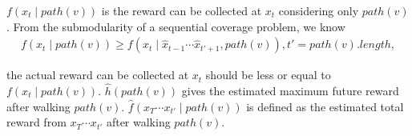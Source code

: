 \documentclass[12pt]{article}
\begin{document}
$ f(x_{t} \mid path(v)) $ is the reward can be collected at $ x_{t} $ considering only $ path(v) $. From the submodularity of a sequential coverage problem, we know 
\begin{equation}
\label{eq:submod1}
\begin{aligned}
f(x_{t} \mid path(v)) \geq f(x_{t} \mid \hat{x}_{t-1} \cdots \hat{x}_{t'+1}, path(v) ),
t' = path(v).length,
\end{aligned}
\end{equation}

the actual reward can be collected at $ x_{t} $ should be less or equal to $ f(x_{t} \mid path(v)) $. $ \hat{h}(path(v)) $ gives the estimated maximum future reward after walking $ path(v) $. $ \hat{f}(x_{T} \cdots x_{t'} \mid path(v) ) $ is defined as the estimated total reward from $ x_{T} \cdots x_{t'} $ after walking $ path(v) $.

\end{document}
